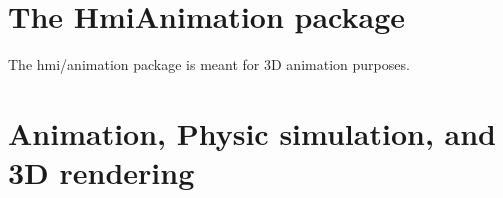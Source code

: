 \ifx \hmianimationreportdir \undefinedmacro {} \fi
\ifx \webserver \undefinedmacro \def \webserver{http://elckerlyc.sourceforge.net/javadoc/Hmi/} \fi

\chapter{The HmiAnimation package}
The hmi/animation package is meant for 3D animation purposes.






\chapter{Animation, Physic simulation, and 3D rendering}
 
 